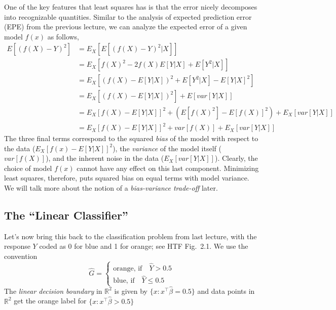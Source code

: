 \documentclass[a4paper]{article}
\begin{document}
One of the key features that least squares has is that the error nicely decomposes into recognizable quantities.  Similar to the analysis of expected prediction error (EPE) from the previous lecture, we can analyze the expected error of a given model $f(x)$ as follows,
\begin{align*}
E[(f(X) - Y)^2] &= E_X[E[(f(X) - Y)^2 | X]]\\
&= E_X[f(X)^2 -2 f(X)E[Y|X] + E[Y^2|X]]\\
&= E_X[(f(X) - E[Y|X])^2 + E[Y^2|X] - E[Y|X]^2]\\
&= E_X[(f(X) - E[Y|X])^2] + E[var[Y|X]]\\
&= E_X[f(X) - E[Y|X]]^2 + (E[f(X)^2] - E[f(X)]^2) + E_X[var[Y|X]]\\
&= E_X[f(X) - E[Y|X]]^2 + var[f(X)] + E_X[var[Y|X]]
\end{align*}
The three final terms correspond to the squared \emph{bias} of the model with respect to the data ($E_X[f(x) - E[Y|X]]^2$), the \emph{variance} of the model itself ($var[f(X)]$), and the inherent noise in the data ($E_X[var[Y|X]]$).  Clearly, the choice of model $f(x)$ cannot have any effect on this last component.  Minimizing least squares, therefore, puts squared bias on equal terms with model variance. We will talk more about the notion of a \emph{bias-variance trade-off} later.

\subsection{The ``Linear Classifier''}
\label{sec:linclass}
Let's now bring this back to the classification problem from last lecture, with the response $Y$ coded as 0 for blue and 1 for orange; see HTF Fig.\ 2.1.  We use the convention
$$\hat{G}=\left\{\begin{array}{c}\text{orange, if}\quad\hat{Y}>0.5\\\text{blue, if}\quad\hat{Y}\le 0.5\end{array}\right.$$
The \emph{linear decision boundary} in $\mathbb{R}^2$ is given by $\{x:x^\top\hat{\beta}=0.5\}$ and data points in $\mathbb{R}^2$ get the orange label for $\{x:x^\top\hat{\beta}>0.5\}$
\end{document}
